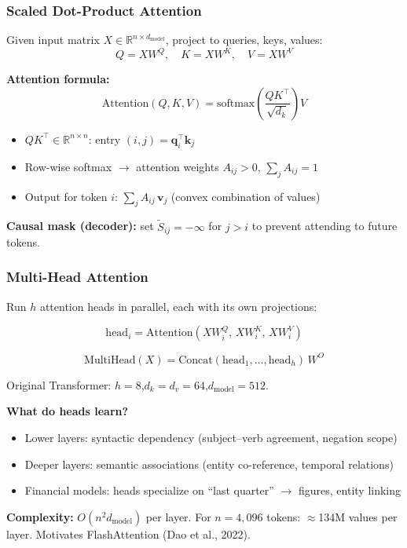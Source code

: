 \documentclass[9pt,t]{beamer}
\begin{document}
\begin{frame}
\frametitle{Scaled Dot-Product Attention}

Given input matrix $X \in \mathbb{R}^{n \times d_{\text{model}}}$, project to queries, keys, values:
\[
Q = XW^Q,\quad K = XW^K,\quad V = XW^V
\]

\begin{underhood}
\textbf{Attention formula:}
\[
\text{Attention}(Q, K, V)
= \text{softmax}\!\left(\frac{QK^\top}{\sqrt{d_k}}\right) V
\]
\begin{itemize}
  \item $QK^\top \in \mathbb{R}^{n \times n}$: entry $(i,j) = \mathbf{q}_i^\top\mathbf{k}_j$
  \item Row-wise softmax $\to$ attention weights $A_{ij} > 0$, $\sum_j A_{ij} = 1$
  \item Output for token $i$: $\sum_j A_{ij}\,\mathbf{v}_j$ (convex combination of values)
\end{itemize}
\end{underhood}

\medskip
\textbf{Causal mask (decoder):} set $\tilde{S}_{ij} = -\infty$ for $j > i$ to prevent attending to future tokens.
\end{frame}

\begin{frame}
\frametitle{Multi-Head Attention}

Run $h$ attention heads in parallel, each with its own projections:

\[
\text{head}_i = \text{Attention}(XW^Q_i,\,XW^K_i,\,XW^V_i)
\]

\[
\text{MultiHead}(X) = \text{Concat}(\text{head}_1,\ldots,\text{head}_h)\,W^O
\]

\medskip
Original Transformer: $h = 8$,\quad $d_k = d_v = 64$,\quad $d_{\text{model}} = 512$.

\medskip
\textbf{What do heads learn?}
\begin{itemize}
  \item Lower layers: syntactic dependency (subject--verb agreement, negation scope)
  \item Deeper layers: semantic associations (entity co-reference, temporal relations)
  \item Financial models: heads specialize on ``last quarter'' $\to$ figures, entity linking
\end{itemize}

\medskip
\textbf{Complexity:} $O(n^2 d_{\text{model}})$ per layer. For $n = 4{,}096$ tokens:
$\approx$134M values per layer. Motivates FlashAttention (Dao et al., 2022).
\end{frame}
\end{document}
